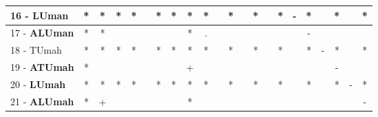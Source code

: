 \begin{table}[h]
\begin{center}
\begin{tabular}{lcc|cc|cc|cc|cc|cc|cc|cc|cc|cc|c}
16 - \textbf{LUman}	& * & * & * & * &   & * & * & * & * &   & * &   & * &   & * & - & * &   & * &   & * \\ \hline
17 - \textbf{ALUman}	& * & * &   &   &   &   &   & * & . &   &   &   &   &   &   &   & - &   &   &   &   \\
18 - TUmah	& * & * & * & * &   & * & * & * & * &   & * &   & * &   & * &   & * & - & * &   & * \\ \hline
19 - \textbf{ATUmah}	& * &   &   &   &   &   &   & + &   &   &   &   &   &   &   &   &   &   & - &   &   \\
20 - \textbf{LUmah}	& * & * & * & * &   & * & * & * & * &   & * &   & * &   & * &   & * &   & * & - & * \\ \hline
21 - \textbf{ALUmah}	& * & + &   &   &   &   &   & * &   &   &   &   &   &   &   &   &   &   &   &   & - \\\end{tabular}
\label{stratsALCKappaFriedIELM}
\end{center}
\end{table}